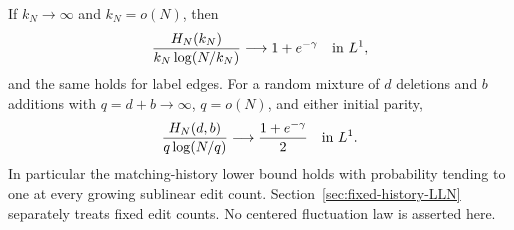 \documentclass[11pt,letterpaper]{article}
\begin{document}
\begin{theorem}
\label{thm:sparse-history-LLN}
If $k_N\to\infty$ and $k_N=o(N)$, then
\begin{equation}\label{eq:sparse-history-LLN}
 \frac{H_N(k_N)}{k_N\log(N/k_N)}
       \longrightarrow1+e^{-\gamma}\quad\hbox{in }L^1,
\end{equation}
and the same holds for label edges. For a random mixture of
$d$ deletions and $b$ additions with $q=d+b\to\infty$,
$q=o(N)$, and either initial parity,
\[
 \frac{H_N(d,b)}{q\log(N/q)}
          \longrightarrow\frac{1+e^{-\gamma}}2
                                      \quad\hbox{in }L^1.
\]
In particular the matching-history lower bound holds with
probability tending to one at every growing sublinear edit count.
Section~\ref{sec:fixed-history-LLN} separately treats fixed edit
counts. No centered fluctuation law is asserted here.
\end{theorem}
\end{document}

